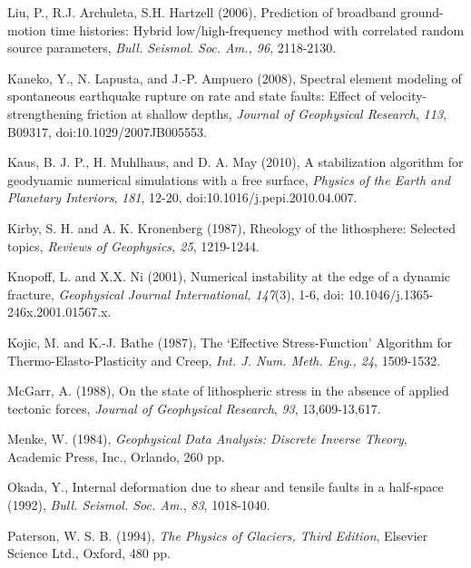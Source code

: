 \documentclass{pylithdoc}
\begin{document}
\begin{thebibliography}{Bibliography}
Liu, P., R.J. Archuleta,
S.H. Hartzell (2006), Prediction of broadband ground-motion time histories:
Hybrid low/high-frequency method with correlated random source parameters,
\textit{Bull. Seismol. Soc. Am., 96}, 2118-2130.

Kaneko, Y., N. Lapusta,
and J.-P. Ampuero (2008), Spectral element modeling of spontaneous
earthquake rupture on rate and state faults: Effect of velocity-strengthening
friction at shallow depths, \textit{Journal of Geophysical Research},\textit{
113}, B09317, doi:10.1029/2007JB005553.

Kaus, B. J. P., H. Muhlhaus,
and D. A. May (2010), A stabilization algorithm for geodynamic numerical
simulations with a free surface, \textit{Physics of the Earth and
Planetary Interiors}, \textit{181}, 12-20, doi:10.1016/j.pepi.2010.04.007.

Kirby,
S. H. and A. K. Kronenberg (1987), Rheology of the lithosphere: Selected
topics, \textit{Reviews of Geophysics, 25}, 1219-1244.

Knopoff, L. and X.X.
Ni (2001), Numerical instability at the edge of a dynamic fracture,
\emph{Geophysical Journal International,}\textit{\emph{ }}\textit{147}(3),
1-6, doi: 10.1046/j.1365-246x.2001.01567.x.

Kojic, M. and K.-J.
Bathe (1987), The `Effective Stress-Function' Algorithm for Thermo-Elasto-Plasticity
and Creep, \emph{Int. J. Num. Meth. Eng}.\emph{, 24}, 1509-1532.

McGarr, A. (1988), On the state
of lithospheric stress in the absence of applied tectonic forces,
\textit{Journal of Geophysical Research}, \textit{93}, 13,609-13,617.

Menke, W. (1984), \textit{Geophysical
Data Analysis: Discrete Inverse Theory}, Academic Press, Inc., Orlando,
260 pp.

Okada, Y., Internal deformation
due to shear and tensile faults in a half-space (1992), \textit{Bull.
Seismol. Soc. Am.}, \textit{83}, 1018-1040.

Paterson, W. S. B. (1994),
\textit{The Physics of Glaciers, Third Edition}, Elsevier Science
Ltd., Oxford, 480 pp.


\end{thebibliography}
\end{document}
